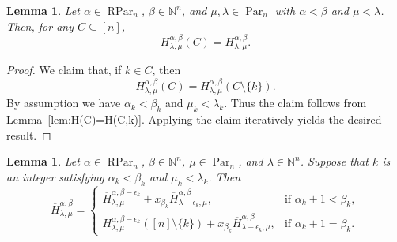 \documentclass[12pt]{amsart}
\numberwithin{equation}{section}
\newtheorem{lem}[thm]{Lemma}
\theoremstyle{definition}
\newcommand\ovH{\overline{H}}
\newcommand\NN{\mathbb{N}}
\newcommand\Par{\operatorname{Par}}
\newcommand\RPar{\operatorname{RPar}}
\begin{document}
\begin{lem}\label{lem:H(1..r)=H}
  Let $\alpha\in\RPar_n$, $\beta\in\NN^n$, and $\mu,\lambda\in\Par_n$ with $\alpha<\beta$
  and $\mu<\lambda$. Then, for any $C\subseteq[n]$,
  \[
H_{\lambda,\mu}^{\alpha,\beta}(C) = H_{\lambda,\mu}^{\alpha,\beta}.
  \]
\end{lem}
\begin{proof}
  We claim that, if $k\in C$, then
  \[
H_{\lambda,\mu}^{\alpha,\beta}(C) = H_{\lambda,\mu}^{\alpha,\beta}(C\setminus\{k\}).
  \]
  By assumption we have $\alpha_k<\beta_k$ and $\mu_k<\lambda_k$. Thus the claim
  follows from Lemma~\ref{lem:H(C)=H(C,k)}. Applying the claim iteratively
  yields the desired result.
\end{proof}




\begin{lem}\label{lem:h=h+xh}
  Let $\alpha\in\RPar_n$, $\beta\in\NN^n$, $\mu\in\Par_n$, and
  $\lambda\in\NN^n$. Suppose that $k$ is an integer satisfying $\alpha_k<
  \beta_k$ and $\mu_k<\lambda_k$. Then
\[
  \ovH_{\lambda,\mu}^{\alpha,\beta} =
  \begin{cases}
  \ovH_{\lambda,\mu}^{\alpha,\beta-\epsilon_k}
  +x_{\beta_k} \ovH_{\lambda-\epsilon_k,\mu}^{\alpha,\beta},
  &\mbox{if $\alpha_k+1<\beta_k$},\\
  H_{\lambda,\mu}^{\alpha,\beta-\epsilon_k}([n]\setminus\{k\})+
  x_{\beta_k} \ovH_{\lambda-\epsilon_k,\mu}^{\alpha,\beta},
  &\mbox{if $\alpha_k+1=\beta_k$}.
  \end{cases}
\]
\end{lem}
\end{document}
